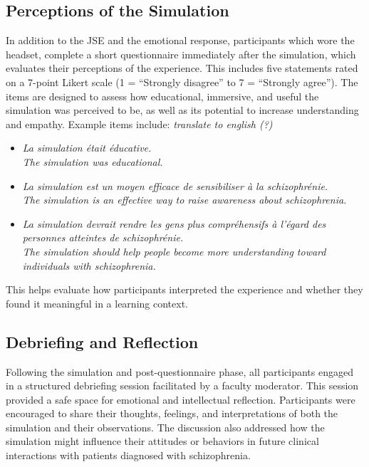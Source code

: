 \subsection{Perceptions of the Simulation}

In addition to the JSE and the emotional response, participants which wore the headset, complete a short questionnaire immediately after the simulation, which evaluates their perceptions of the experience. This includes five statements rated on a 7-point Likert scale (1 = “Strongly disagree” to 7 = “Strongly agree”). The items are designed to assess how educational, immersive, and useful the simulation was perceived to be, as well as its potential to increase understanding and empathy. Example items include: \emph{translate to english (?)}

\begin{itemize}
    \item \textit{La simulation était éducative.} \\
    \textit{The simulation was educational.}

    \item \textit{La simulation est un moyen efficace de sensibiliser à la schizophrénie.} \\
    \textit{The simulation is an effective way to raise awareness about schizophrenia.}

    \item \textit{La simulation devrait rendre les gens plus compréhensifs à l’égard des personnes atteintes de schizophrénie.} \\
    \textit{The simulation should help people become more understanding toward individuals with schizophrenia.}
\end{itemize}

This helps evaluate how participants interpreted the experience and whether they found it meaningful in a learning context.

\subsection{Debriefing and Reflection}

Following the simulation and post-questionnaire phase, all participants engaged in a structured debriefing session facilitated by a faculty moderator. This session provided a safe space for emotional and intellectual reflection. Participants were encouraged to share their thoughts, feelings, and interpretations of both the simulation and their observations. The discussion also addressed how the simulation might influence their attitudes or behaviors in future clinical interactions with patients diagnosed with schizophrenia.

